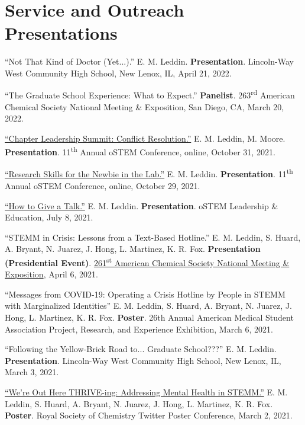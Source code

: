 \documentclass[letterpaper,11pt]{article}
\begin{document}
\section{Service and Outreach Presentations}
\begin{etaremune}[start=20]
\item \textnormal{``Not That Kind of Doctor (Yet...).'' E. M. Leddin. \textbf{Presentation}. Lincoln-Way West Community High School, New Lenox, IL, April 21, 2022.}
  \item \textnormal{``The Graduate School Experience: What to Expect.'' \textbf{Panelist}. 263\textsuperscript{rd} American Chemical Society National Meeting \& Exposition, San Diego, CA, March 20, 2022.}
  \item \textnormal{\href{http://bit.ly/2021-oSTEM-CLS}{``Chapter Leadership Summit: Conflict Resolution.''} E. M. Leddin, M. Moore. \textbf{Presentation}. 11\textsuperscript{th} Annual oSTEM Conference, online, October 31, 2021.}
  \item \textnormal{\href{http://bit.ly/2021-oSTEM-RSNL}{``Research Skills for the Newbie in the Lab.''} E. M. Leddin. \textbf{Presentation}. 11\textsuperscript{th} Annual oSTEM Conference, online, October 29, 2021.}
  \item \textnormal{\href{https://bit.ly/2021-LE-Give-Talk
}{``How to Give a Talk.''} E. M. Leddin. \textbf{Presentation}. oSTEM Leadership \& Education, July 8, 2021.}
  \item \textnormal{``STEMM in Crisis: Lessons from a Text-Based Hotline.'' E. M. Leddin, S. Huard, A. Bryant, N. Juarez, J. Hong, L. Martinez, K. R. Fox. \textbf{Presentation (Presidential Event)}. \href{https://bit.ly/2021-THRIVE-ACS}{261\textsuperscript{st} American Chemical Society National Meeting \& Exposition}, April 6, 2021.}
  \item \textnormal{``Messages from COVID-19: Operating a Crisis Hotline by People in STEMM with Marginalized Identities'' E. M. Leddin, S. Huard, A. Bryant, N. Juarez, J. Hong, L. Martinez, K. R. Fox. \textbf{Poster}. 26th Annual American Medical Student Association Project, Research, and Experience Exhibition, March 6, 2021.}
  \item \textnormal{``Following the Yellow-Brick Road to... Graduate School???'' E. M. Leddin. \textbf{Presentation}. Lincoln-Way West Community High School, New Lenox, IL, March 3, 2021.}
  \item \textnormal{\href{https://twitter.com/ThriveLifeline/status/1366720589130592259?s=20}{``We're Out Here THRIVE-ing: Addressing Mental Health in STEMM.''} E. M. Leddin, S. Huard, A. Bryant, N. Juarez, J. Hong, L. Martinez, K. R. Fox. \textbf{Poster}. Royal Society of Chemistry Twitter Poster Conference, March 2, 2021.}

\end{etaremune}
\end{document}
